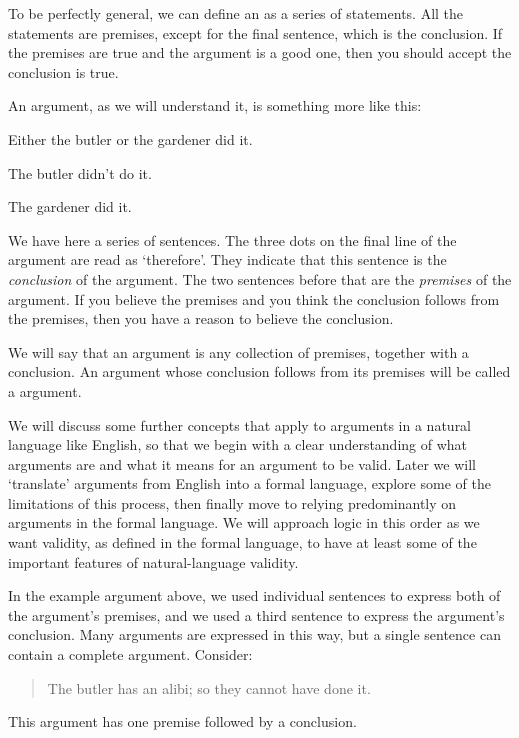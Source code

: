 \documentclass[PHIL101-Textbook.tex]{subfiles}
\begin{document}
To be perfectly general, we can define an  as a series of statements. All the statements are premises, except for the final sentence, which is the conclusion. If the premises are true and the argument is a good one, then you should accept the conclusion is true.

An argument, as we will understand it, is something more like this:
	\begin{earg}\label{argButlergardener}
		\item[] Either the butler or the gardener did it.
		\item[] The butler didn't do it.
		\item[\therefore] The gardener did it.
	\end{earg}
We have here a series of sentences. The three dots on the final line of the argument are read as `therefore'. They indicate that this sentence is the \emph{conclusion} of the argument. The two sentences before that are the \emph{premises} of the argument. If you believe the premises and you think the conclusion follows from the premises, then you have a reason to believe the conclusion.

We will say that an argument is any collection of premises, together with a conclusion. An argument whose conclusion follows from its premises will be called a  argument.

We will discuss some further concepts that apply to arguments in a natural language like English, so that we begin with a clear understanding of what arguments are and what it means for an argument to be valid. Later we will `translate' arguments from English into a formal language, explore some of the limitations of this process, then finally move to relying predominantly on arguments in the formal language. We will approach logic in this order as we want validity, as defined in the formal language, to have at least some of the important features of natural-language validity.

In the example argument above, we used individual sentences to express both of the argument's premises, and we used a third sentence to express the argument's conclusion. Many arguments are expressed in this way, but a single sentence can contain a complete argument. Consider:
	\begin{quote}
		 The butler has an alibi; so they cannot have done it.
	\end{quote}
This argument has one premise followed by a conclusion. 
\end{document}
